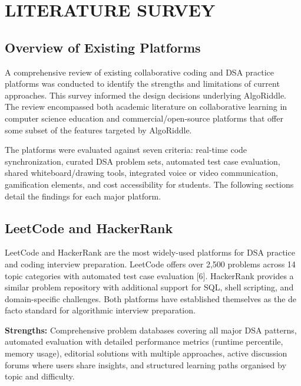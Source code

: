 \chapter{LITERATURE SURVEY}

\section{Overview of Existing Platforms}

A comprehensive review of existing collaborative coding and DSA practice platforms was conducted to identify the strengths and limitations of current approaches. This survey informed the design decisions underlying AlgoRiddle. The review encompassed both academic literature on collaborative learning in computer science education and commercial/open-source platforms that offer some subset of the features targeted by AlgoRiddle.

The platforms were evaluated against seven criteria: real-time code synchronization, curated DSA problem sets, automated test case evaluation, shared whiteboard/drawing tools, integrated voice or video communication, gamification elements, and cost accessibility for students. The following sections detail the findings for each major platform.

\section{LeetCode and HackerRank}

LeetCode and HackerRank are the most widely-used platforms for DSA practice and coding interview preparation. LeetCode offers over 2,500 problems across 14 topic categories with automated test case evaluation [6]. HackerRank provides a similar problem repository with additional support for SQL, shell scripting, and domain-specific challenges. Both platforms have established themselves as the de facto standard for algorithmic interview preparation.

\textbf{Strengths:} Comprehensive problem databases covering all major DSA patterns, automated evaluation with detailed performance metrics (runtime percentile, memory usage), editorial solutions with multiple approaches, active discussion forums where users share insights, and structured learning paths organised by topic and difficulty.

